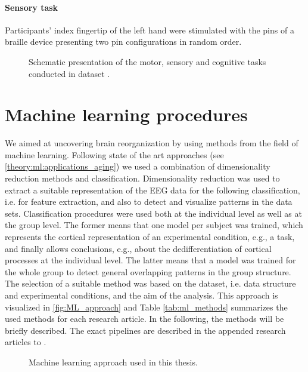 \paragraph{Sensory task}
Participants' index fingertip of the left hand were stimulated with the pins of a braille device presenting two pin configurations in random order. 

\begin{figure}[h]
\begin{center}

\caption[Schematic presentation of the motor, sensory and cognitive tasks conducted in dataset .]{Schematic presentation of the motor, sensory and cognitive tasks conducted in dataset .}
\label{fig:DSII_exp3}
\end{center}
\end{figure}

\section{Machine learning procedures} 
We aimed at uncovering brain reorganization by using methods from the field of machine learning. Following state of the art approaches (see \autoref{theory:ml:applications_aging}) we used a combination of dimensionality reduction methods and classification. Dimensionality reduction was used to extract a suitable representation of the EEG data for the following classification, i.e. for feature extraction, and also to detect and visualize patterns in the data sets. Classification procedures were used both at the individual level as well as at the group level. The former means that one model per subject was trained, which represents the cortical representation of an experimental condition, e.g., a task, and finally allows conclusions, e.g., about the dedifferentiation of cortical processes at the individual level. The latter means that a model was trained for the whole group to detect general overlapping patterns in the group structure. The selection of a suitable method was based on the dataset, i.e. data structure and experimental conditions, and the aim of the analysis. This approach is visualized in \autoref{fig:ML_approach} and Table \autoref{tab:ml_methods}  summarizes the used methods for each research article. In the following, the methods will be briefly described. The exact pipelines are described in the appended research articles  to .

\begin{figure}[h]
\begin{center}

\caption[Machine learning approach used in this thesis]{Machine learning approach used in this thesis.}
\label{fig:ML_approach}
\end{center}
\end{figure}

